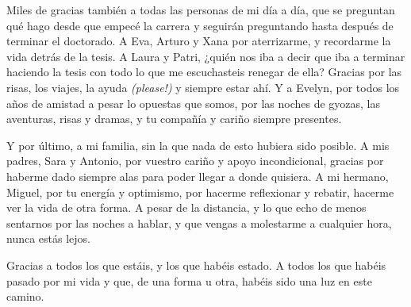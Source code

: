 Miles de gracias también a todas las personas de mi día a día, que se preguntan qué hago desde que empecé la carrera y seguirán preguntando hasta después de terminar el doctorado. 
A Eva, Arturo y Xana por aterrizarme, y recordarme la vida detrás de la tesis. 
A Laura y Patri, ¿quién nos iba a decir que iba a terminar haciendo la tesis con todo lo que me escuchasteis renegar de ella? Gracias por las risas, los viajes, la ayuda \textit{(please!)} y siempre estar ahí. 
Y a Evelyn, por todos los años de amistad a pesar lo opuestas que somos, por las noches de gyozas, las aventuras, risas y dramas, y tu compañía y cariño siempre presentes. 

Y por último, a mi familia, sin la que nada de esto hubiera sido posible.
A mis padres, Sara y Antonio, por vuestro cariño y apoyo incondicional, gracias por haberme dado siempre alas para poder llegar a donde quisiera. 
A mi hermano, Miguel, por tu energía y optimismo, por hacerme reflexionar y rebatir, hacerme ver la vida de otra forma. 
A pesar de la distancia, y lo que echo de menos sentarnos por las noches a hablar, y que vengas a molestarme a cualquier hora, nunca estás lejos. 

Gracias a todos los que estáis, y los que habéis estado.
A todos los que habéis pasado por mi vida y que, de una forma u otra, habéis sido una luz en este camino. 




